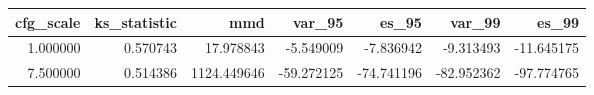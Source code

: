 \begin{tabular}{rrrrrrr}
\toprule
cfg_scale & ks_statistic & mmd & var_95 & es_95 & var_99 & es_99 \\
\midrule
1.000000 & 0.570743 & 17.978843 & -5.549009 & -7.836942 & -9.313493 & -11.645175 \\
7.500000 & 0.514386 & 1124.449646 & -59.272125 & -74.741196 & -82.952362 & -97.774765 \\
\bottomrule
\end{tabular}
